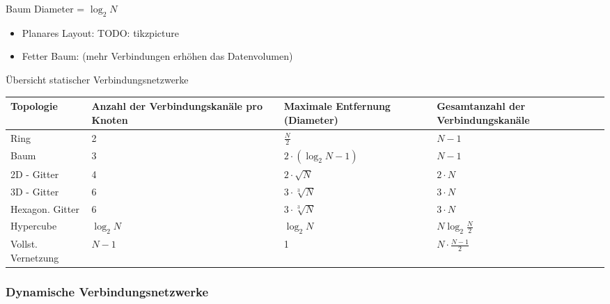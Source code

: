 \begin{defi}{Baum}
    Diameter = $\log_2 N$
    \begin{itemize}
        \item Planares Layout:
              TODO: tikzpicture
        \item Fetter Baum: (mehr Verbindungen erhöhen das Datenvolumen)
    \end{itemize}
\end{defi}

\begin{bonus}{Übersicht statischer Verbindungsnetzwerke}
    \begin{tabularx}{\textwidth}{|l|X|X|X|}
        \hline
        Topologie          & Anzahl der Verbindungskanäle pro Knoten & Maximale Entfernung (Diameter) & Gesamtanzahl der Verbindungskanäle \\
        \hline
        Ring               & 2                                       & $\frac{N}{2}$                  & $N-1$                              \\
        \hline
        Baum               & 3                                       & $2\cdot (\log_2 N - 1)$        & $N-1$                              \\
        \hline
        2D - Gitter        & 4                                       & $2\cdot \sqrt{N}$              & $2\cdot N$                         \\
        \hline
        3D - Gitter        & 6                                       & $3\cdot \sqrt[3]{N}$           & $3\cdot N$                         \\
        \hline
        Hexagon. Gitter    & 6                                       & $3\cdot \sqrt[3]{N}$           & $3\cdot N$                         \\ 
        \hline
        Hypercube          & $\log_2 N$                              & $\log_2 N$                     & $N \log_2 \frac{N}{2}$             \\
        \hline
        Vollst. Vernetzung & $N - 1$                                 & 1                              & $N \cdot \frac{N-1}{2}$            \\
        \hline
    \end{tabularx}
\end{bonus}

\subsubsection{Dynamische Verbindungsnetzwerke}

